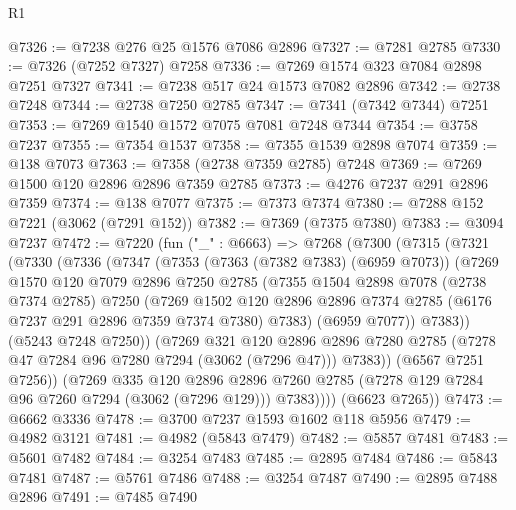 \begin{lexlean}{R1}
\begin{coremodule}
@7326 := @7238 @276 @25 @1576 @7086 @2896
@7327 := @7281 @2785
@7330 := @7326 (@7252 @7327) @7258
@7336 := @7269 @1574 @323 @7084 @2898 @7251 @7327
@7341 := @7238 @517 @24 @1573 @7082 @2896
@7342 := @2738 @7248
@7344 := @2738 @7250 @2785
@7347 := @7341 (@7342 @7344) @7251
@7353 := @7269 @1540 @1572 @7075 @7081 @7248 @7344
@7354 := @3758 @7237
@7355 := @7354 @1537
@7358 := @7355 @1539 @2898 @7074
@7359 := @138 @7073
@7363 := @7358 (@2738 @7359 @2785) @7248
@7369 := @7269 @1500 @120 @2896 @2896 @7359 @2785
@7373 := @4276 @7237 @291 @2896 @7359
@7374 := @138 @7077
@7375 := @7373 @7374
@7380 := @7288 @152 @7221 (@3062 (@7291 @152))
@7382 := @7369 (@7375 @7380)
@7383 := @3094 @7237
@7472 := @7220
    (fun ("_" : @6663) =>
    @7268
      (@7300
        (@7315
          (@7321
            (@7330
              (@7336
                (@7347
                  (@7353
                    (@7363 (@7382 @7383) (@6959 @7073))
                    (@7269
                      @1570
                      @120
                      @7079
                      @2896
                      @7250
                      @2785
                      (@7355
                        @1504
                        @2898
                        @7078
                        (@2738 @7374 @2785)
                        @7250
                        (@7269
                          @1502
                          @120
                          @2896
                          @2896
                          @7374
                          @2785
                          (@6176 @7237 @291 @2896 @7359 @7374 @7380)
                          @7383)
                        (@6959 @7077))
                      @7383))
                  (@5243 @7248 @7250))
                (@7269
                  @321
                  @120
                  @2896
                  @2896
                  @7280
                  @2785
                  (@7278 @47 @7284 @96 @7280 @7294 (@3062 (@7296 @47)))
                  @7383))
              (@6567 @7251 @7256))
            (@7269
              @335
              @120
              @2896
              @2896
              @7260
              @2785
              (@7278 @129 @7284 @96 @7260 @7294 (@3062 (@7296 @129)))
              @7383))))
      (@6623 @7265))
@7473 := @6662 @3336
@7478 := @3700 @7237 @1593 @1602 @118 @5956
@7479 := @4982 @3121
@7481 := @4982 (@5843 @7479)
@7482 := @5857 @7481
@7483 := @5601 @7482
@7484 := @3254 @7483
@7485 := @2895 @7484
@7486 := @5843 @7481
@7487 := @5761 @7486
@7488 := @3254 @7487
@7490 := @2895 @7488 @2896
@7491 := @7485 @7490

\end{coremodule}
\end{lexlean}

